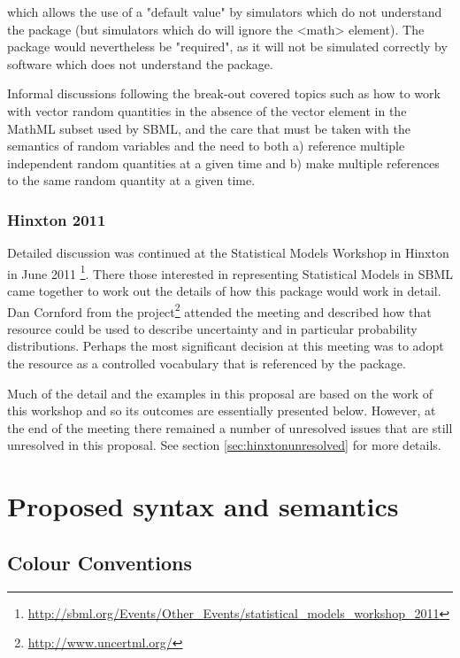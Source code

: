 \documentclass[draftspec]{sbmlpkgspec}
\begin{document}
which allows the use of a "default value" by simulators which do not
understand the package (but simulators which do will ignore the <math>
element). The package would nevertheless be "required", as it will not
be simulated correctly by software which does not understand the
package.

Informal discussions following the break-out covered topics such as
how to work with vector random quantities in the absence of the vector
element in the MathML subset used by SBML, and the care that must be
taken with the semantics of random variables and the need to both a)
reference multiple independent random quantities at a given time and
b) make multiple references to the same random quantity at a given
time.

\subsubsection{Hinxton 2011}

Detailed discussion was continued at the Statistical Models Workshop
in Hinxton in June 2011%
\footnote{\url{http://sbml.org/Events/Other_Events/statistical_models_workshop_2011}}. There
those interested in representing Statistical Models in SBML came
together to work out the details of how this package would work in
detail. Dan Cornford from the \uncertml
project\footnote{\url{http://www.uncertml.org/}} attended the meeting
and described how that resource could be used to describe uncertainty
and in particular probability distributions. Perhaps the most
significant decision at this meeting was to adopt the \uncertml
resource as a controlled vocabulary that is referenced by the \distrib package.

Much of the detail and the examples in this proposal are based on
the work of this workshop and so its outcomes are essentially
presented below. However, at the end of the meeting there remained a
number of unresolved issues that are still unresolved in this
proposal. See section \vref{sec:hinxtonunresolved} for more details.

\section{Proposed syntax and semantics}

\subsection{Colour Conventions}
\end{document}
